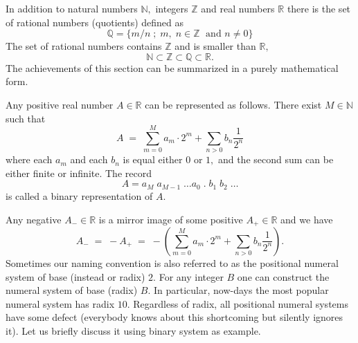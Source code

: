 \documentclass[color=black,11pt]{elegantpaper}
\begin{document}
In addition to natural numbers $\mathbb{N},$  integers $\mathbb{Z}$ and real numbers $\mathbb{R}$ there is the set of rational numbers (quotients) defined as
$$
\mathbb{Q} = \{ m/n\;;\; m,\;n \in \mathbb{Z}\;\mbox{ and } n \not= 0 \}
$$
The set of rational numbers contains $\mathbb{Z}$ and is smaller than $\mathbb{R},$
$$
\mathbb{N} \subset \mathbb{Z} \subset \mathbb{Q}  \subset \mathbb{R}.
$$ 
The achievements of this section can be summarized in a purely mathematical form.
\begin{theorem}
Any positive real number $A \in \mathbb{R}$ can be represented as follows. There exist $M \in \mathbb{N}$ such that
$$
 A \;=\; \sum_{m= 0}^M a_m \cdot 2^m + \sum_{n > 0}b_n \frac{1}{2^n} 
$$
where each $a_m$ and each $b_n$ is equal either $0$ or $1,$ and  the second sum can be either finite or infinite. The record 
$$
A = a_M \; a_{M-1}\; \dots a_0\;.\;b_1\; b_2 \;\dots 
$$
is called a binary representation of $A.$
\end{theorem}
Any negative $A_{-} \in \mathbb{R}$ is a mirror image of some positive $A_{+} \in \mathbb{R}$ and we have
$$
 A_{-}\; =\; -A_{+} \;=\;- (\sum_{m= 0}^M a_m \cdot 2^m + \sum_{n > 0}b_n \frac{1}{2^n}).
$$
Sometimes our naming convention is also referred to as the positional numeral system of base (instead or radix) $2.$  For any integer $B$ one can construct the numeral system of base (radix) $B.$ In particular, now-days the most popular numeral system has radix $10.$ Regardless of radix, all positional numeral systems have some defect (everybody knows about this shortcoming but silently ignores it). Let us briefly discuss it using binary system as example. 
\end{document}
